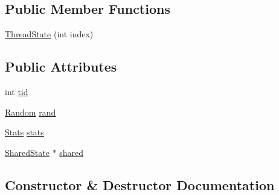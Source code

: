 \subsection*{Public Member Functions}
\begin{DoxyCompactItemize}
\item 
\hyperlink{structleveldb_1_1anonymous__namespace_02db__bench_8cc_03_1_1_thread_state_af2c2fac705476e4fbb141766bbf898dc}{Thread\+State} (int index)
\end{DoxyCompactItemize}
\subsection*{Public Attributes}
\begin{DoxyCompactItemize}
\item 
int \hyperlink{structleveldb_1_1anonymous__namespace_02db__bench_8cc_03_1_1_thread_state_a8ced82e5f099a0d7f582ec6ca89c56e1}{tid}
\item 
\hyperlink{classleveldb_1_1_random}{Random} \hyperlink{structleveldb_1_1anonymous__namespace_02db__bench_8cc_03_1_1_thread_state_a2c9e6cda5c11288bc04fee96f5d94f11}{rand}
\item 
\hyperlink{classleveldb_1_1anonymous__namespace_02db__bench_8cc_03_1_1_stats}{Stats} \hyperlink{structleveldb_1_1anonymous__namespace_02db__bench_8cc_03_1_1_thread_state_ad5c7b6992d52f621389eee96f50afb25}{stats}
\item 
\hyperlink{structleveldb_1_1anonymous__namespace_02db__bench_8cc_03_1_1_shared_state}{Shared\+State} $\ast$ \hyperlink{structleveldb_1_1anonymous__namespace_02db__bench_8cc_03_1_1_thread_state_a1f6527f9fa5ab37cd68e4d99faf274b6}{shared}
\end{DoxyCompactItemize}


\subsection{Constructor \& Destructor Documentation}
\hypertarget{structleveldb_1_1anonymous__namespace_02db__bench_8cc_03_1_1_thread_state_af2c2fac705476e4fbb141766bbf898dc}{}
